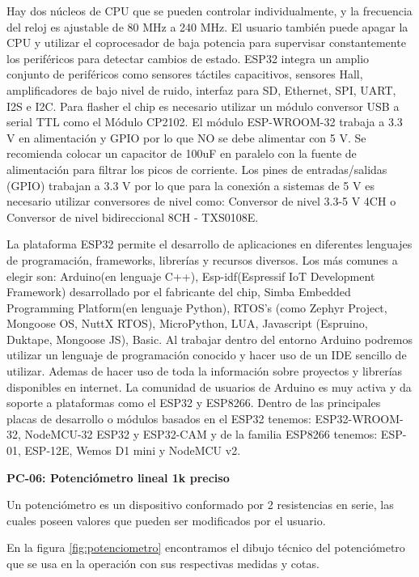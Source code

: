     Hay dos núcleos de CPU que se pueden controlar individualmente, y la frecuencia del reloj es ajustable de 80 MHz a 240 MHz. El usuario también puede apagar la CPU y utilizar el coprocesador de baja potencia para supervisar constantemente los periféricos para detectar cambios de estado. ESP32 integra un amplio conjunto de periféricos como sensores táctiles capacitivos, sensores Hall, amplificadores de bajo nivel de ruido, interfaz para SD, Ethernet, SPI, UART, I2S e I2C. Para flasher el chip es necesario utilizar un módulo conversor USB a serial TTL como el Módulo CP2102.
    El módulo ESP-WROOM-32 trabaja a 3.3 V en alimentación y GPIO por lo que NO se debe alimentar con 5 V. Se recomienda colocar un capacitor de 100uF en paralelo con la fuente de alimentación para filtrar los picos de corriente. Los pines de entradas/salidas (GPIO) trabajan a 3.3 V por lo que para la conexión a sistemas de 5 V es necesario utilizar conversores de nivel como: Conversor de nivel 3.3-5 V 4CH o Conversor de nivel bidireccional 8CH - TXS0108E.
    
    
    La plataforma ESP32 permite el desarrollo de aplicaciones en diferentes lenguajes de programación, frameworks, librerías y recursos diversos. Los más comunes a elegir son: Arduino(en lenguaje C++), Esp-idf(Espressif IoT Development Framework) desarrollado por el fabricante del chip, Simba Embedded Programming Platform(en lenguaje Python), RTOS's (como Zephyr Project, Mongoose OS, NuttX RTOS), MicroPython, LUA, Javascript (Espruino, Duktape, Mongoose JS), Basic. Al trabajar dentro del entorno Arduino podremos utilizar un lenguaje de programación conocido y hacer uso de un IDE sencillo de utilizar. Ademas de hacer uso de toda la información sobre proyectos y librerías disponibles en internet. La comunidad de usuarios de Arduino es muy activa y da soporte a plataformas como el ESP32 y ESP8266. Dentro de las principales placas de desarrollo o módulos basados en el ESP32 tenemos: ESP32-WROOM-32, NodeMCU-32 ESP32 y ESP32-CAM y de la familia ESP8266 tenemos: ESP-01, ESP-12E, Wemos D1 mini y NodeMCU v2.\cite{naylamp}
    
    
    
    \textbf{PC-06: Potenciómetro lineal 1k preciso }
    
    Un potenciómetro es un dispositivo conformado por 2 resistencias en serie, las cuales poseen valores que pueden ser modificados por el usuario. 
    
    En la figura \ref{fig:potenciometro} encontramos el dibujo técnico del potenciómetro que se usa en la operación con sus respectivas medidas y cotas.
    
